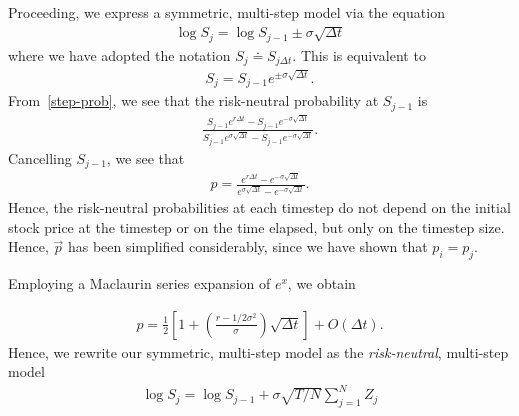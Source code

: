 \documentclass[12pt]{article}
\theoremstyle{plain}
\theoremstyle{definition}
\theoremstyle{remark}
\numberwithin{equation}{section}  %
\begin{document}
Proceeding, we express a symmetric, multi-step model via the equation
\begin{equation*}
\begin{split}
	\log S_{j} = \log S_{j - 1} \pm \sigma \sqrt{\Delta t}
\end{split}
\end{equation*}
where we have adopted the notation $S_{j} \doteq S_{j \Delta t}$.
This is equivalent to 
\begin{equation*}
\begin{split}
	S_{j} = S_{j -1} e^{\pm \sigma \sqrt{\Delta t}}.
\end{split}
\end{equation*}
From~\eqref{step-prob}, we see that the risk-neutral probability
at $S_{j-1}$ is
\begin{equation*}
\begin{split}
	\frac{S_{j-1}e^{r \Delta t} - S_{j-1} e^{-\sigma \sqrt{\Delta
	t}}}{S_{j-1}e^{\sigma \sqrt{\Delta t}} - S_{j-1}e^{-\sigma \sqrt{\Delta t}}}.
\end{split}
\end{equation*}
Cancelling $S_{j-1}$, we see that 
\begin{equation*}
\begin{split}
	p  = \frac{e^{r \Delta t} -  e^{-\sigma \sqrt{\Delta t}}}{e^{\sigma
		\sqrt{\Delta t}} - e^{-\sigma \sqrt{\Delta t}}}.
\end{split}
\end{equation*}
Hence, the risk-neutral probabilities at each timestep do not depend
on the initial stock price at the timestep or on the time elapsed,
but only on the timestep size. Hence, $\vec{p}$ has been simplified
considerably, since we have shown that $p_{i} = p_{j}$. 

Employing a Maclaurin series expansion of $e^{x}$, we obtain

\begin{equation*}
\begin{split}
	p = \frac{1}{2} \left[ 1 + \left( \frac{r - 1/2 \sigma^{2}}{\sigma}
	\right)\sqrt{\Delta t} \right]  + O(\Delta t).
\end{split}
\end{equation*}
Hence, we rewrite our symmetric, multi-step model as the
\emph{risk-neutral}, multi-step model
\begin{equation*}
\begin{split}
	\log S_{j} = \log S_{j-1} + \sigma \sqrt{T/N} \sum_{j=1}^{N} Z_{j}
\end{split}
\end{equation*}
\end{document}
